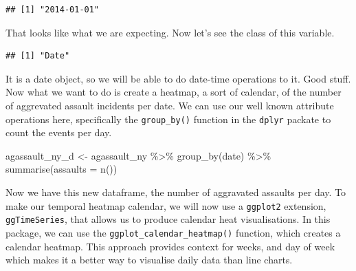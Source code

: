 \documentclass[
]{book}
\newenvironment{Shaded}{\begin{snugshade}}{\end{snugshade}}
\newcommand{\AttributeTok}[1]{\textcolor[rgb]{0.77,0.63,0.00}{#1}}
\newcommand{\DecValTok}[1]{\textcolor[rgb]{0.00,0.00,0.81}{#1}}
\newcommand{\FunctionTok}[1]{\textcolor[rgb]{0.00,0.00,0.00}{#1}}
\newcommand{\NormalTok}[1]{#1}
\newcommand{\OtherTok}[1]{\textcolor[rgb]{0.56,0.35,0.01}{#1}}
\newcommand{\SpecialCharTok}[1]{\textcolor[rgb]{0.00,0.00,0.00}{#1}}
\begin{document}
\begin{Shaded}
\end{Shaded}

\begin{verbatim}
## [1] "2014-01-01"
\end{verbatim}

That looks like what we are expecting. Now let's see the class of this variable.

\begin{Shaded}
\end{Shaded}

\begin{verbatim}
## [1] "Date"
\end{verbatim}

It is a date object, so we will be able to do date-time operations to it. Good stuff. Now what we want to do is create a heatmap, a sort of calendar, of the number of aggrevated assault incidents per date. We can use our well known attribute operations here, specifically the \texttt{group\_by()} function in the \texttt{dplyr} packate to count the events per day.

\begin{Shaded}
\begin{Highlighting}[]
\NormalTok{agassault\_ny\_d }\OtherTok{\textless{}{-}}\NormalTok{ agassault\_ny }\SpecialCharTok{\%\textgreater{}\%}
                    \FunctionTok{group\_by}\NormalTok{(date) }\SpecialCharTok{\%\textgreater{}\%}
                    \FunctionTok{summarise}\NormalTok{(}\AttributeTok{assaults =} \FunctionTok{n}\NormalTok{())}
\end{Highlighting}
\end{Shaded}

Now we have this new dataframe, the number of aggravated assaults per day. To make our temporal heatmap calendar, we will now use a \texttt{ggplot2} extension, \texttt{ggTimeSeries}, that allows us to produce calendar heat visualisations. In this package, we can use the \texttt{ggplot\_calendar\_heatmap()} function, which creates a calendar heatmap. This approach provides context for weeks, and day of week which makes it a better way to visualise daily data than line charts.
\end{document}
